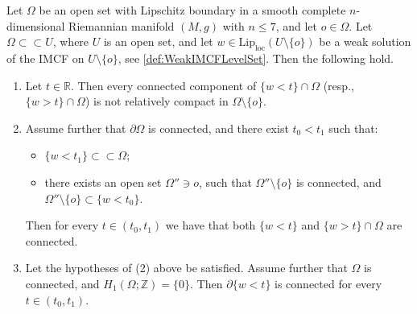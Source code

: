 \documentclass[a4paper,12pt,reqno]{amsart}
\numberwithin{equation}{section}
\theoremstyle{plain}
\theoremstyle{definition}
\theoremstyle{remark}
\begin{document}
{ \begin{lemma}\label{lem:Connectedness}
         Let $\Omega$ be an open set 
         with Lipschitz boundary 
         in a smooth complete $n$-dimensional Riemannian manifold $(M,g)$ with $n\le 7$, and let $o\in\Omega$. Let $\Omega\subset \subset U$, where $U$ is an open set, and let $w\in\mathrm{Lip}_{\mathrm{loc}}(U\setminus\{o\})$ be a weak solution of the IMCF on $U\setminus\{o\}$, see \cref{def:WeakIMCFLevelSet}. Then the following hold.
         \begin{enumerate}
             \item Let $t\in\mathbb R$. Then every connected component of $\{w<t\}\cap\Omega$ (resp., $\{w>t\}\cap\Omega$) is not relatively compact in $\Omega\setminus\{o\}$.
             \item Assume further that $\partial\Omega$ is connected, and there exist $t_0<t_1$ such that:
             \begin{itemize}
                 \item $\{w<t_1\} \subset\subset \Omega$;
                 \item there exists an open set $\Omega''\ni o$, such that $\Omega''\setminus\{o\}$ is connected, and $\Omega''\setminus\{o\}\subset\{w<t_0\}$.
             \end{itemize}
             Then for every $t\in (t_0,t_1)$ we have that both $\{w<t\}$ and $\{w>t\}\cap\Omega$ are connected.
             \item 
            Let the hypotheses of (2) above be satisfied. Assume further that $\Omega$ is connected, and $H_1(\Omega;\mathbb Z)=\{0\}$. Then $\partial\{w<t\}$ is connected for every $t\in (t_0,t_1)$.
         \end{enumerate}
\end{lemma}



\begin{figure}[h]
    \begin{center}
\end{center}
\end{figure}}
\end{document}
